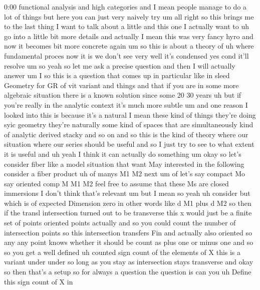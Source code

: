 \begin{unfinished}{0:00}
functional  analysis  and  high  categories
and  I  mean  people  manage  to  do  a  lot  of
things  but  here  you  can  just  very
naively
try
um  all  right  so  this  brings  me  to  the
last  thing  I  want  to  talk  about  a  little
and  this  one  I  actually  want  to  uh  go
into  a  little  bit  more  details  and
actually  I  mean  this  was  very  fancy  hyro
and  now  it  becomes  bit  more  concrete
again
um  so  this  is  about  a  theory  of
uh  where  fundamental
proces  now  it  is  we  don't  see  very  well
it's  condensed  yes  cond  it'll
resolve
um  so  yeah  so  let  me  ask  a  precise
question  and  then  I  will  actually  answer
um  I  so  this  is  a  question  that  comes  up
in  particular  like  in  sleed  Geometry  for
GR  of  vit  variant  and  things  and  that  if
you  are  in  some  more  algebraic
situation  there  is  a  known  solution
since  some  20  30  years  uh  but  if  you're
really  in  the  analytic  context  it's  much
more  subtle  um
and  one  reason  I  looked  into  this  is
because  it's  a  natural  I  mean  these  kind
of  things  they're  doing  syic  geometry
they're  naturally  some  kind  of  spaces
that  are  simultaneously  kind  of  analytic
derived  stacky  and  so  on  and  so  this  is
the  kind  of  theory
where
our  situation  where  our  series  should  be
useful  and  so  I  just  try  to  see  to  what
extent  it  is  useful  and  uh  yeah  I  think
it  can  actually  do  something
um  okay  so  let's
consider  fiber  like  a  model  situation
that  want  May  interested  in  the
following  consider  a  fiber
product  uh  of  manys  M1
M2  next
um
of  let's  say  compact
Mo  say  oriented
comp  M  M1
M2  feel  free  to  assume  that  these  Ms  are
closed  immersions  I  don't  think  that's
relevant  um
but  I  mean  so  yeah  uh  consider  but  which
is  of  expected  Dimension
zero  in  other  words  like  d  M1  plus  d
M2  so  then  if  the  transl  intersection
turned  out  to  be  transverse  this  x  would
just  be  a  finite  set  of  points  oriented
points  actually  and  so  you  could  count
the  number  of  intersection
points
so  this  intersection
transfers
Fin  and  actually  also
oriented  so  any  any  point  knows  whether
it  should  be  count  as  plus  one  or  minus
one  and  so  so  you  get  a  well
defined  uh
counted  sign  count  of  the  elements  of
X  this  is  a  variant  under
under  so  long  as  you  stay  as
intersection  stays  transverse  and  okay
so  then  that's  a  setup  so  for  always  a
question  the  question  is  can
you  uh  Define  this  sign  count  of  X  in

\end{unfinished}
